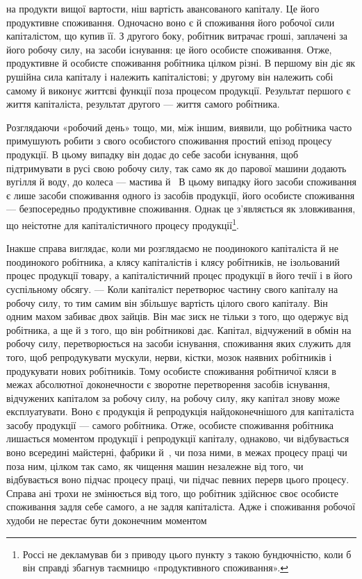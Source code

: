 \parcont{}  %
на продукти вищої вартости, ніш вартість авансованого капіталу.
Це його продуктивне споживання. Одночасно воно є й
споживання його робочої сили капіталістом, що купив її. З другого
боку, робітник витрачає гроші, заплачені за його робочу
силу, на засоби існування: це його особисте споживання. Отже,
продуктивне й особисте споживання робітника цілком різні.
В першому він діє як рушійна сила капіталу і належить капіталістові;
у другому він належить собі самому й виконує життєві
функції поза процесом продукції. Результат першого є життя
капіталіста, результат другого — життя самого робітника.

Розглядаючи «робочий день» тощо, ми, між іншим, виявили,
що робітника часто примушують робити з свого особистого споживання
простий епізод процесу продукції. В цьому випадку
він додає до себе засоби існування, щоб підтримувати в русі
свою робочу силу, так само як до парової машини додають вугілля
й воду, до колеса — мастива й~ В цьому випадку його засоби
споживання є лише засоби споживання одного із засобів продукції,
його особисте споживання — безпосередньо продуктивне
споживання. Однак це з’являється як зловживання, що неістотне
для капіталістичного процесу продукції\footnote{
Россі не декламував би з приводу цього пункту з такою бундючністю,
коли б він справді збагнув таємницю «продуктивного споживання».
}.

Інакше справа виглядає, коли ми розглядаємо не поодинокого
капіталіста й не поодинокого робітника, а клясу капіталістів
і клясу робітників, не ізольований процес продукції товару, а
капіталістичний процес продукції в його течії і в його суспільному
обсягу. — Коли капіталіст перетворює частину свого капіталу
на робочу силу, то тим самим він збільшує вартість цілого
свого капіталу. Він одним махом забиває двох зайців. Він має
зиск не тільки з того, що одержує від робітника, а ще й з того,
що він робітникові дає. Капітал, відчужений в обмін на робочу
силу, перетворюється на засоби існування, споживання яких
служить для того, щоб репродукувати мускули, нерви, кістки,
мозок наявних робітників і продукувати нових робітників. Тому
особисте споживання робітничої кляси в межах абсолютної
доконечности є зворотне перетворення засобів існування, відчужених
капіталом за робочу силу, на робочу силу, яку капітал
знову може експлуатувати. Воно є продукція й репродукція
найдоконечнішого для капіталіста засобу продукції — самого
робітника. Отже, особисте споживання робітника лишається
моментом продукції і репродукції капіталу, однаково, чи відбувається
воно всередині майстерні, фабрики й~, чи поза ними,
в межах процесу праці чи поза ним, цілком так само, як чищення
машин незалежне від того, чи відбувається воно підчас процесу
праці, чи підчас певних перерв цього процесу. Справа ані
трохи не змінюється від того, що робітник здійснює своє особисте
споживання задля себе самого, а не задля капіталіста. Адже і
споживання робочої худоби не перестає бути доконечним моментом
\parbreak{}  %
